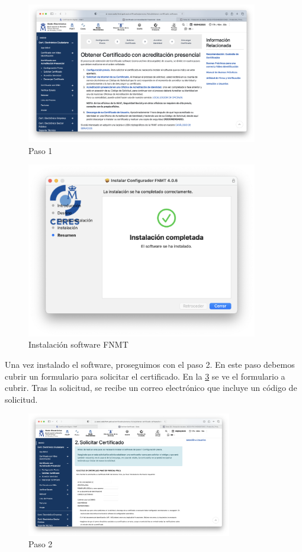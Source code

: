 \begin{figure}[H]   
    \centering
    \includegraphics[width=0.9\textwidth]{paso1_ej5a.png}
    \caption{Paso 1}
    \label{fig:paso1}
\end{figure}

\begin{figure}[H]   
    \centering
    \includegraphics[width=0.9\textwidth]{instalacion_FNMT_ej5a.png}
    \caption{Instalación software FNMT}
    \label{fig:instalacion_FNMT}
\end{figure}

Una vez instalado el software, proseguimos con el paso 2. En este paso debemos cubrir un formulario para solicitar el certificado. En la \ref{fig:paso2} se ve el formulario a cubrir. Tras la solicitud, se recibe un correo electrónico que incluye un código de solicitud. 

\begin{figure}[H]   
    \centering
    \includegraphics[width=0.8\textwidth]{paso2_ej5a.png}
    \caption{Paso 2}
    \label{fig:paso2}
\end{figure}

